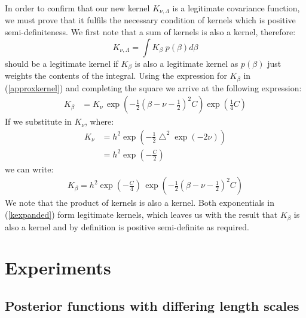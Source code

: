 \documentclass{article}
\begin{document}
In order to confirm that our new kernel $K_{\nu,\Lambda}$ is a legitimate covariance function, we must prove that it fulfils the necessary condition of kernels which is positive semi-definiteness. We first note that a sum of kernels is also a kernel, therefore:
\begin{equation}
K_{\nu,\Lambda} = \int K_\beta \;p(\beta)d\beta
\end{equation}
should be a legitimate kernel if $K_\beta$ is also a legitimate kernel as $p(\beta)$ just weights the contents of the integral. Using the expression for $K_\beta$ in (\ref{approxkernel}) and completing the square we arrive at the following expression:
\begin{align}
K_\beta &= K_{\nu} \,  \exp \left(  -\frac{1}{2} \left( \beta - \nu - \frac{1}{2} \right) ^ 2C   \right) \exp \left( \frac{1}{4}C \right)
\end{align}
If we substitute in $K_\nu$, where:
\begin{align}
K_{\nu} &= h^2 \exp\left( -\frac{1}{2}\bigtriangleup^2 \exp(-2\nu) \right) \nonumber\\
&= h^2 \exp\left( -\frac{C}{2} \right)
\end{align}
we can write:
\begin{align}
K_{\beta} = h^2  \exp\left( -\frac{C}{4} \right) \,  \exp \left(  -\frac{1}{2} \left( \beta - \nu - \frac{1}{2} \right) ^ 2C   \right) \label{kexpanded}
\end{align}
We note that the product of kernels is also a kernel. Both exponentials in (\ref{kexpanded}) form legitimate kernels, which leaves us with the result that $K_\beta$ is also a kernel and by definition is positive semi-definite as required.






\section{Experiments}



\subsection{Posterior functions with differing length scales}
\end{document}
